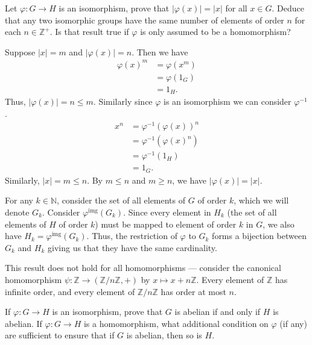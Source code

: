 \documentclass[12 pt, letterpaper]{hmcpset}
\begin{document}
\begin{problem}
	Let $\varphi : G \to H$ is an isomorphism, prove that $\lvert \varphi(x) \rvert = \lvert x \rvert$ for all $x \in G$. Deduce that any two isomorphic groups have the same number of elements of order $n$ for each $n \in \mathbb Z^+$. Is that result true if $\varphi$ is only assumed to be a homomorphism?
\end{problem}

\begin{solution}
	Suppose $\lvert x \rvert = m$ and $\lvert \varphi(x) \rvert = n$. Then we have
	\[
		\begin{split}
			\varphi(x)^m & = \varphi(x^m) \\
				     & = \varphi(1_G) \\
				     & = 1_H.
		\end{split}
	\]
	Thus, $\lvert \varphi(x) \rvert = n \le m$. Similarly since $\varphi$ is an isomorphism we can consider $\varphi^{-1}$.
	\[
		\begin{split}
			x^n & = \varphi^{-1}(\varphi(x))^n \\
			    & = \varphi^{-1}(\varphi(x)^n) \\
			    & = \varphi^{-1}(1_H) \\
			    & = 1_G.
		\end{split}
	\]
	Similarly, $\lvert x \rvert = m \le n$. By $m \le n$ and $m \ge n$, we have $\lvert \varphi(x) \rvert = \lvert x \rvert$. 

	For any $k \in \mathbb N$, consider the set of all elements of $G$ of order $k$, which we will denote $G_k$. Consider $\varphi^\text{img}(G_k)$. Since every element in $H_k$ (the set of all elements of $H$ of order $k$) must be mapped to element of order $k$ in $G$, we also have $H_k = \varphi^\text{img}(G_k)$. Thus, the restriction of $\varphi$ to $G_k$ forms a bijection between $G_k$ and $H_k$ giving us that they have the same cardinality. 

	This result does not hold for all homomorphisms --- consider the canonical homomorphism $\psi : \mathbb Z \to (\mathbb Z/n\mathbb Z, +)$ by $x \mapsto x + n \mathbb Z$. Every element of $\mathbb Z$ has infinite order, and every element of $\mathbb Z/n \mathbb Z$ has order at most $n$.
\end{solution}

\pagebreak

\begin{problem}
	If $\varphi : G \to H$ is an isomorphism, prove that $G$ is abelian if and only if $H$ is abelian. If $\varphi : G \to H$ is a homomorphism, what additional condition on $\varphi$ (if any) are sufficient to ensure that if $G$ is abelian, then so is $H$.
\end{problem}
\end{document}
